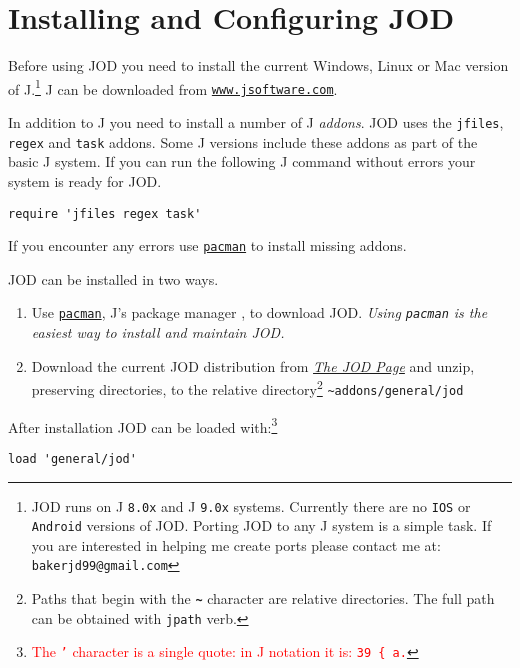 \section{Installing and Configuring JOD}\label{ss:jodcfgdesc}

Before using JOD you need to install the current Windows, Linux or Mac version of J.\footnote{JOD runs on 
 J \texttt{8.0x} and J \texttt{9.0x} systems. Currently there are no \texttt{IOS} or \texttt{Android} versions of JOD. Porting JOD 
to any J system is a simple task.
If you are interested in helping me create ports please contact me at:  
\texttt{bakerjd99@gmail.com}
} J can be downloaded from \href{https://www.jsoftware.com}{\texttt{www.jsoftware.com}}.

In addition to J you need to install a number of J \emph{addons}. JOD uses the
\texttt{jfiles}, \texttt{regex} and \texttt{task} addons.  Some J versions
include these addons as part of the basic J system. If you can run the following J command
without errors your system is ready for JOD. 
\begin{lstlisting}[frame=single,framerule=0pt,label=lst:reqaddons]
   require 'jfiles regex task'
\end{lstlisting}
If you encounter any errors  use \href{https://code.jsoftware.com/wiki/Pacman}{\texttt{pacman}} to install 
missing addons.
 
JOD can be installed in two ways.  
\begin{enumerate}
	\item Use \href{https://code.jsoftware.com/wiki/Pacman}{\texttt{pacman}}, J's package manager 
	\cite{jwiki:pacman}, to download JOD. \emph{Using \texttt{pacman} is the easiest way to install and maintain JOD.}
	\item Download the current JOD distribution from \href{https://bakerjd99.wordpress.com/the-jod-page/}{\emph{The JOD Page}} \cite{baker:jodpages} and unzip, preserving directories, to the relative directory\footnote{Paths that begin with the \textbf{\texttt{\~}} character are relative directories. The full path can be obtained with \texttt{jpath} verb. } \verb|~addons/general/jod|
\end{enumerate}

After installation JOD can be loaded with:\footnote{\textcolor{red}{The \texttt{'} character 
is a single quote: in J notation it is: \texttt{39 \{ a.}}
}
\begin{lstlisting}[frame=single,framerule=0pt,label=lst:loadjod00]
   load 'general/jod'
\end{lstlisting}

